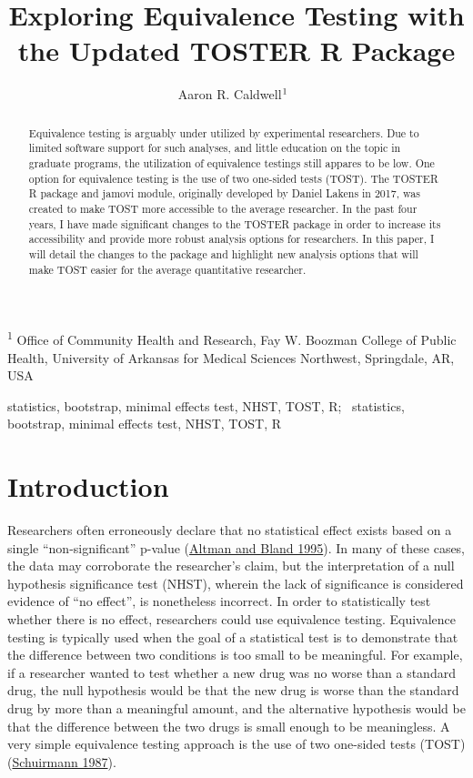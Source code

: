 \documentclass[
]{interact}
\title{Exploring Equivalence Testing with the Updated TOSTER R Package}
\author{Aaron R.
Caldwell$\textsuperscript{1}$~\orcidlink{0000-0002-4541-6283}}
\begin{document}
\captionsetup{labelsep=space}
\maketitle
\textsuperscript{1} Office of Community Health and Research, Fay W.
Boozman College of Public Health, University of Arkansas for Medical
Sciences Northwest, Springdale, AR, USA
\begin{abstract}
Equivalence testing is arguably under utilized by experimental
researchers. Due to limited software support for such analyses, and
little education on the topic in graduate programs, the utilization of
equivalence testings still appares to be low. One option for equivalence
testing is the use of two one-sided tests (TOST). The TOSTER R package
and jamovi module, originally developed by Daniel Lakens in 2017, was
created to make TOST more accessible to the average researcher. In the
past four years, I have made significant changes to the TOSTER package
in order to increase its accessibility and provide more robust analysis
options for researchers. In this paper, I will detail the changes to the
package and highlight new analysis options that will make TOST easier
for the average quantitative researcher.
\end{abstract}
\begin{keywords}
\def\sep{;\ }
statistics, bootstrap, minimal effects test, NHST, TOST, R\sep 
statistics, bootstrap, minimal effects test, NHST, TOST, R
\end{keywords}
\ifdefined\Shaded\renewenvironment{Shaded}{\begin{tcolorbox}[interior hidden, boxrule=0pt, borderline west={3pt}{0pt}{shadecolor}, enhanced, frame hidden, breakable, sharp corners]}{\end{tcolorbox}}\fi

\hypertarget{introduction}{%
\section{Introduction}\label{introduction}}

Researchers often erroneously declare that no statistical effect exists
based on a single ``non-significant'' p-value
(\protect\hyperlink{ref-blandaltman95}{Altman and Bland 1995}). In many
of these cases, the data may corroborate the researcher's claim, but the
interpretation of a null hypothesis significance test (NHST), wherein
the lack of significance is considered evidence of ``no effect'', is
nonetheless incorrect. In order to statistically test whether there is
no effect, researchers could use equivalence testing. Equivalence
testing is typically used when the goal of a statistical test is to
demonstrate that the difference between two conditions is too small to
be meaningful. For example, if a researcher wanted to test whether a new
drug was no worse than a standard drug, the null hypothesis would be
that the new drug is worse than the standard drug by more than a
meaningful amount, and the alternative hypothesis would be that the
difference between the two drugs is small enough to be meaningless. A
very simple equivalence testing approach is the use of two one-sided
tests (TOST) (\protect\hyperlink{ref-schuirmann1987}{Schuirmann 1987}).
\end{document}
